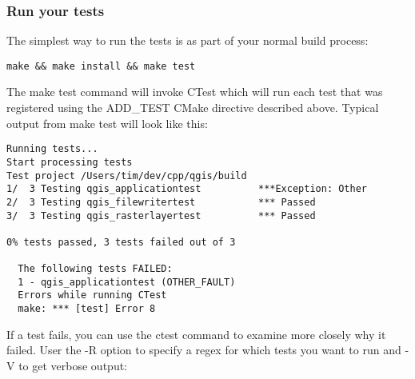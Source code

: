 \subsubsection{Run your tests}
The simplest way to run the tests is as part of your normal build process:

\begin{verbatim}
make && make install && make test
\end{verbatim}

The make test command will invoke CTest which will run each test that was
registered using the ADD\_TEST CMake directive described above. Typical output
from make test will look like this:

\begin{verbatim}
Running tests...
Start processing tests
Test project /Users/tim/dev/cpp/qgis/build
1/  3 Testing qgis_applicationtest          ***Exception: Other
2/  3 Testing qgis_filewritertest           *** Passed
3/  3 Testing qgis_rasterlayertest          *** Passed

0% tests passed, 3 tests failed out of 3

  The following tests FAILED:
  1 - qgis_applicationtest (OTHER_FAULT)
  Errors while running CTest
  make: *** [test] Error 8
\end{verbatim}

If a test fails, you can use the ctest command to examine more closely why it
failed. User the -R option to specify a regex for which tests you want to run
and -V to get verbose output:

